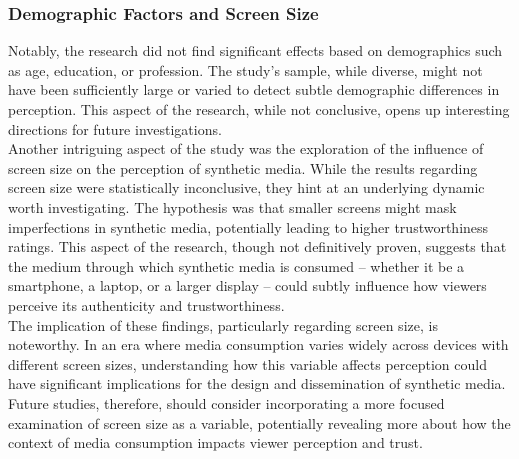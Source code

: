 \documentclass[
  a4paper,  %
  twoside,  %
  bibliography=totoc,
  headsepline,
  cleardoublepage=empty,
  parskip=half,
  draft=false
]{scrbook}
\begin{document}
\subsubsection{Demographic Factors and Screen Size}
Notably, the research did not find significant effects based on demographics such as age, education, or profession. The study's sample, while diverse, might not have been sufficiently large or varied to detect subtle demographic differences in perception. This aspect of the research, while not conclusive, opens up interesting directions for future investigations. \\
Another intriguing aspect of the study was the exploration of the influence of screen size on the perception of synthetic media. While the results regarding screen size were statistically inconclusive, they hint at an underlying dynamic worth investigating. The hypothesis was that smaller screens might mask imperfections in synthetic media, potentially leading to higher trustworthiness ratings. This aspect of the research, though not definitively proven, suggests that the medium through which synthetic media is consumed – whether it be a smartphone, a laptop, or a larger display – could subtly influence how viewers perceive its authenticity and trustworthiness. \\
The implication of these findings, particularly regarding screen size, is noteworthy. In an era where media consumption varies widely across devices with different screen sizes, understanding how this variable affects perception could have significant implications for the design and dissemination of synthetic media. Future studies, therefore, should consider incorporating a more focused examination of screen size as a variable, potentially revealing more about how the context of media consumption impacts viewer perception and trust.
\end{document}
